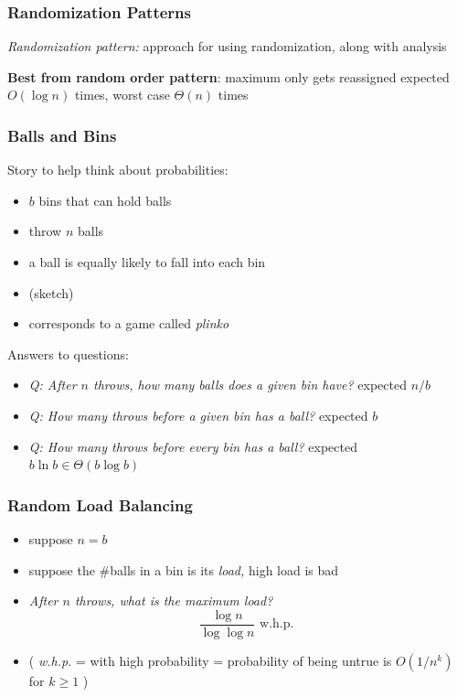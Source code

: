 \documentclass[10pt]{beamer}
\begin{document}
\begin{frame} \frametitle{Randomization Patterns}
\emph{Randomization pattern:} approach for using randomization, along with
analysis
\vspace{1cm}

\textbf{Best from random order pattern}: maximum only gets reassigned expected $O(\log n)$ times,
worst case $\Theta(n)$ times

\end{frame}

\begin{frame} \frametitle{Balls and Bins}
Story to help think about probabilities:
\begin{itemize}
  \item $b$ bins that can hold balls
  \item throw $n$ balls
  \item a ball is equally likely to fall into each bin
  \item (sketch)
  \item corresponds to a game called \emph{plinko}
\end{itemize}

Answers to questions:
\begin{itemize}
  \item \emph{Q: After $n$ throws, how many balls does a given bin have?} expected $n/b$
  \item \emph{Q: How many throws before a given bin has a ball?} expected $b$
  \item \emph{Q: How many throws before every bin has a ball?} expected $b \ln b \in \Theta(b \log b)$
\end{itemize}
\end{frame}

\begin{frame} \frametitle{Random Load Balancing}
\begin{itemize}
  \item suppose $n=b$
  \item suppose the \#balls in a bin is its \emph{load,} high load is bad
  \item \emph{After $n$ throws, what is the maximum load?}
    \[ \frac{\log n}{\log \log n} \text{ w.h.p. } \]
  \item ( \emph{w.h.p.} = with high probability = probability of being untrue is $O(1/n^k)$ for $k \geq 1$ )
\end{itemize}
\end{frame}
\end{document}
